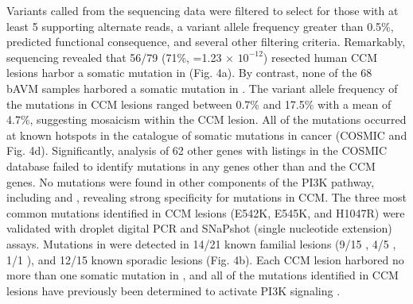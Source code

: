 Variants called from the sequencing data were filtered to select for those with at least 5 supporting alternate reads, a variant allele frequency greater than 0.5\%, predicted functional consequence, and several other filtering criteria. Remarkably, sequencing revealed that 56/79 (71\%, =1.23 $\times$ $10^{-12}$) resected human CCM lesions harbor a somatic mutation in  (Fig. 4a). By contrast, none of the 68 bAVM samples harbored a somatic mutation in . The variant allele frequency of the  mutations in CCM lesions ranged between 0.7\% and 17.5\% with a mean of 4.7\%, suggesting mosaicism within the CCM lesion. All of the  mutations occurred at known hotspots in the catalogue of somatic mutations in cancer (COSMIC and Fig. 4d). Significantly, analysis of 62 other genes with listings in the COSMIC database failed to identify mutations in any genes other than  and the CCM genes. No mutations were found in other components of the PI3K pathway, including  and , revealing strong specificity for  mutations in CCM. The three most common  mutations identified in CCM lesions (E542K, E545K, and H1047R) were validated with droplet digital PCR and SNaPshot (single nucleotide extension) assays. Mutations in  were detected in 14/21 known familial lesions (9/15 , 4/5 , 1/1 ), and 12/15 known sporadic lesions (Fig. 4b). Each CCM lesion harbored no more than one somatic mutation in , and all of the  mutations identified in CCM lesions have previously been determined to activate PI3K signaling \citep{dogruluk2015}.  

